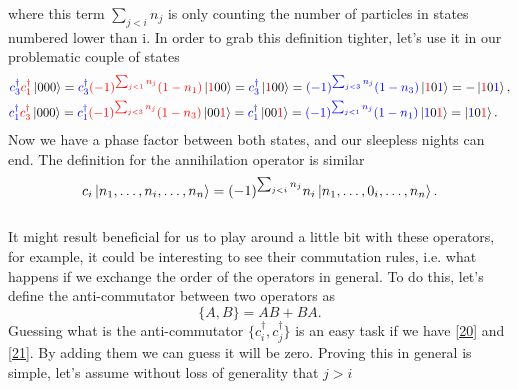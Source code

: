 where this term $\sum_{j<i}n_j$ is only counting the number of particles in states numbered lower than i. In order to grab this definition tighter, let's use it in our problematic couple of states
\begin{eqnarray}
    \textcolor{blue}{c_3^\dagger}\textcolor{red}{c_1^\dagger}\ket{000} = \textcolor{blue}{c_3^\dagger}\textcolor{red}{(-1)^{\sum_{j<1}n_j}}\textcolor{red}{(1-n_1)}\ket{\textcolor{red}{1}00} = \textcolor{blue}{c_3^\dagger}\ket{\textcolor{red}{1}00}= \textcolor{blue}{(-1)^{\sum_{j<3}n_j}(1-n_3)}\ket{\textcolor{red}{1}0\textcolor{blue}{1}}=-\ket{\textcolor{red}{1}0\textcolor{blue}{1}},\label{20}\\
    \textcolor{blue}{c_1^\dagger}\textcolor{red}{c_3^\dagger}\ket{000} = \textcolor{blue}{c_1^\dagger} \textcolor{red}{(-1)^{\sum_{j<3}n_j}(1-n_3)} \ket{00\textcolor{red}{1}} =  \textcolor{blue}{c_1^\dagger} \ket{00\textcolor{red}{1}} = \textcolor{blue}{(-1)^{\sum_{j<1}n_j}(1-n_1)} \ket{\textcolor{blue}{1}0\textcolor{red}{1}}= \ket{\textcolor{blue}{1}0\textcolor{red}{1}}.\label{21}\quad
\end{eqnarray}
Now we have a phase factor between both states, and our sleepless nights can end. The definition for the annihilation operator is similar
\begin{equation}
  c_i \ket{n_1,\ldots,n_i,\ldots,n_n} = (-1)^{\sum_{j<i}n_j}n_i\ket{n_1,\ldots,0_i,\ldots,n_n}.
\end{equation}\\

It might result beneficial for us to play around a little bit with these operators, for example, it could be interesting to see their commutation rules, i.e. what happens if we exchange the order of the operators in general. To do this, let's define the anti-commutator between two operators as 
\begin{equation}
  \{A,B\} = AB + BA.
\end{equation}
Guessing what is the anti-commutator $\{c_i^\dagger,c_j^\dagger\} $ is an easy task if we have \ref{20} and \ref{21}. By adding them we can guess it will be zero. Proving this in general is simple, let's assume without loss of generality that $j>i$

